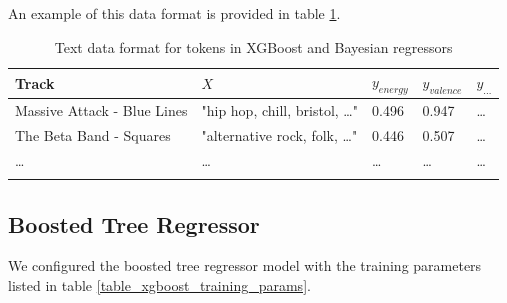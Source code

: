 \documentclass[sn-mathphys]{sn-jnl}%
\theoremstyle{thmstyleone}%
\theoremstyle{thmstyletwo}%
\theoremstyle{thmstylethree}%
\begin{document}
An example of this data format is provided in table \ref{text_format}.

\begin{table}[h]
      \begin{center}
      \begin{minipage}{\textwidth}
      \caption{Text data format for tokens in XGBoost and Bayesian regressors}\label{text_format}%
      \begin{tabular}{@{}lllll@{}}
      \toprule
      Track                         & $X$                                   & $y_{energy}$ & $y_{valence}$ & $y_{\dots}$ \\
      \midrule
      Massive Attack - Blue Lines   & "hip hop, chill, bristol, \dots"      & 0.496        & 0.947         & \dots  \\
      The Beta Band - Squares       & "alternative rock, folk, \dots"       & 0.446        & 0.507         & \dots \\
      \dots                         & \dots                                 & \dots        & \dots         & \dots  \\
      \botrule
      \end{tabular}
      \end{minipage}
      \end{center}
\end{table}




\subsection{Boosted Tree Regressor}

We configured the boosted tree regressor model with the training parameters listed in table \ref{table_xgboost_training_params}.
\end{document}
